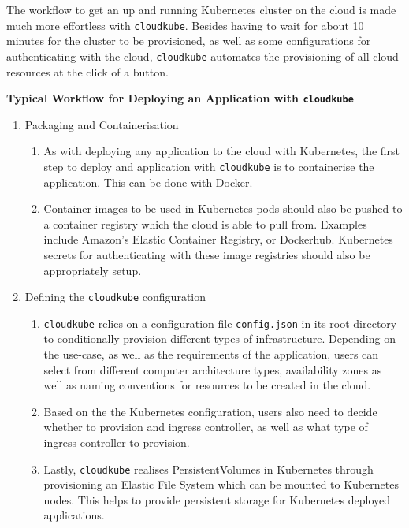The workflow to get an up and running Kubernetes cluster on the cloud is made much more effortless with \texttt{cloudkube}.  Besides having to wait for about 10 minutes for the cluster to be provisioned, as well as some configurations for authenticating with the cloud, \texttt{cloudkube} automates the provisioning of all cloud resources at the click of a button.

\textbf{Typical Workflow for Deploying an Application with \texttt{cloudkube}}
\begin{enumerate}
    \item Packaging and Containerisation 
        \begin{enumerate}
            \item As with deploying any application to the cloud with Kubernetes, the first step to deploy and application with \texttt{cloudkube} is to containerise the application. This can be done with Docker. 
            \item Container images to be used in Kubernetes pods should also be pushed to a container registry which the cloud is able to pull from. Examples include Amazon’s Elastic Container Registry, or Dockerhub. Kubernetes secrets for authenticating with these image registries should also be appropriately setup.
        \end{enumerate}
    \item Defining the \texttt{cloudkube} configuration 
        \begin{enumerate}
      
            \item \texttt{cloudkube} relies on a configuration file \texttt{config.json} in its root directory to conditionally provision different types of infrastructure. Depending on the use-case, as well as the requirements of the application, users can select from different computer architecture types, availability zones as well as naming conventions for resources to be created in the cloud.
            \item Based on the the Kubernetes configuration, users also need to decide whether to provision and ingress controller, as well as what type of ingress controller to provision.
            \item Lastly, \texttt{cloudkube} realises PersistentVolumes in Kubernetes through provisioning an Elastic File System which can be mounted to Kubernetes nodes. This helps to provide persistent storage for Kubernetes deployed applications.


\end{enumerate}
\end{enumerate}
